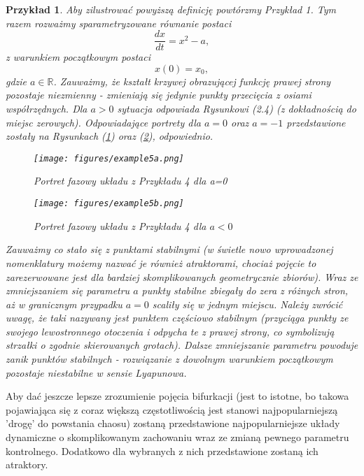 \documentclass[12pt, twoside]{book}
\newtheorem{przyklad}{Przykład}
\begin{document}
\begin{przyklad}\label{przyklad5}
	Aby zilustrować powyższą definicję powtórzmy Przykład 1. Tym razem rozważmy sparametryzowane równanie postaci
	\begin{equation}
	\frac{dx}{dt} = x^2-a,
	\end{equation}
	z warunkiem początkowym postaci
	\begin{equation}
	x(0) = x_{0},
	\end{equation}
	gdzie $ a \in \mathbb{R} $. Zauważmy, że kształt krzywej obrazującej funkcję prawej strony pozostaje niezmienny - zmieniają się jedynie punkty przecięcia z osiami współrzędnych. Dla $ a > 0 $ sytuacja odpowiada Rysunkowi (2.4) (z dokładnością do miejsc zerowych). Odpowiadające portrety dla $ a = 0 $ oraz $ a = -1 $ przedstawione zostały na Rysunkach (\ref{Fig6}) oraz (\ref{Fig7}), odpowiednio.
	\begin{figure}[H]
	\texttt{[image: figures/example5a.png]} 
	\centering
	\caption{Portret fazowy układu z Przykładu 4 dla a=0}
	\label{Fig6}
	\end{figure}
	\begin{figure}[H]
	\texttt{[image: figures/example5b.png]} 
	\centering
	\caption{Portret fazowy układu z Przykładu 4 dla $ a<0 $}
	\label{Fig7}
	\end{figure}
Zauważmy co stało się z punktami stabilnymi (w świetle nowo wprowadzonej nomenklatury możemy nazwać je również atraktorami, chociaż pojęcie to zarezerwowane jest dla bardziej skomplikowanych geometrycznie zbiorów). Wraz ze zmniejszaniem się parametru $ a $ punkty stabilne zbiegały do zera z różnych stron, aż w granicznym przypadku $ a=0 $ scaliły się w jednym miejscu. Należy zwrócić uwagę, że taki nazywany jest punktem częściowo stabilnym (przyciąga punkty ze swojego lewostronnego otoczenia i odpycha te z prawej strony, co symbolizują strzałki o zgodnie skierowanych grotach). Dalsze zmniejszanie parametru powoduje zanik punktów stabilnych - rozwiązanie z dowolnym warunkiem początkowym pozostaje niestabilne w sensie Lyapunowa. 
\end{przyklad}
Aby dać jeszcze lepsze zrozumienie pojęcia bifurkacji (jest to istotne, bo takowa pojawiająca się z coraz większą częstotliwością jest stanowi najpopularniejszą 'drogę' do powstania chaosu) zostaną przedstawione najpopularniejsze układy dynamiczne o skomplikowanym zachowaniu wraz ze zmianą pewnego parametru kontrolnego. Dodatkowo dla wybranych z nich przedstawione zostaną ich atraktory.
\end{document}
